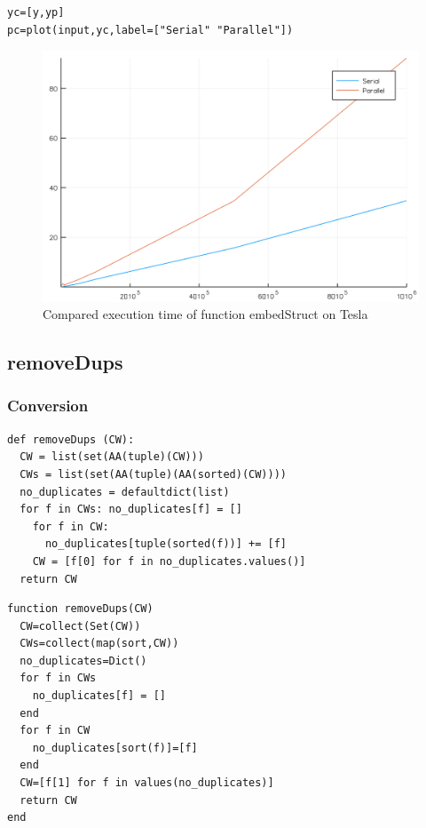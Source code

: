 \documentclass[a4paper,12pt]{article}
\begin{document}
\noindent {}
\begin{Verbatim}[fontsize=\footnotesize]
yc=[y,yp]
pc=plot(input,yc,label=["Serial" "Parallel"])
\end{Verbatim}
\begin{figure}[!h]
\centering
\includegraphics[scale=0.08]{compembedStruct.png}
\caption{Compared execution time of function embedStruct on Tesla}
\end{figure}

\newpage
\subsection{removeDups}
\subsubsection{Conversion}
\begin{Verbatim}[fontsize=\footnotesize]
def removeDups (CW):
  CW = list(set(AA(tuple)(CW)))
  CWs = list(set(AA(tuple)(AA(sorted)(CW))))
  no_duplicates = defaultdict(list)
  for f in CWs: no_duplicates[f] = []
    for f in CW:
      no_duplicates[tuple(sorted(f))] += [f]
    CW = [f[0] for f in no_duplicates.values()]
  return CW  
\end{Verbatim}
\noindent{}
\begin{Verbatim}[fontsize=\footnotesize]
function removeDups(CW)
  CW=collect(Set(CW))
  CWs=collect(map(sort,CW))
  no_duplicates=Dict()
  for f in CWs
    no_duplicates[f] = []
  end
  for f in CW
    no_duplicates[sort(f)]=[f]
  end
  CW=[f[1] for f in values(no_duplicates)]
  return CW
end 
\end{Verbatim}
\end{document}
